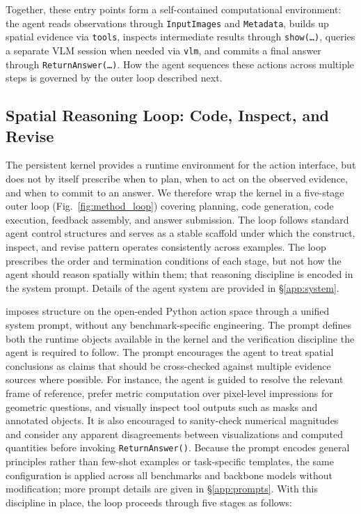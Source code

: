 Together, these entry points form a self-contained computational environment: the agent reads observations through \texttt{InputImages} and \texttt{Metadata}, builds up spatial evidence via \texttt{tools}, inspects intermediate results through \texttt{show(\ldots)}, queries a separate VLM session when needed via \texttt{vlm}, and commits a final answer through \texttt{ReturnAnswer(\ldots)}.
How the agent sequences these actions across multiple steps is governed by the outer loop described next.

\subsection{Spatial Reasoning Loop: Code, Inspect, and Revise}
\label{sec:loop}

The persistent kernel provides a runtime environment for the action interface, but does not by itself prescribe when to plan, when to act on the observed evidence, and when to commit to an answer.
We therefore wrap the kernel in a five-stage outer loop (Fig.~\ref{fig:method_loop}) covering planning, code generation, code execution, feedback assembly, and answer submission.
The loop follows standard agent control structures and serves as a stable scaffold under which the construct, inspect, and revise pattern operates consistently across examples.
The loop prescribes the order and termination conditions of each stage, but not how the agent should reason spatially within them; that reasoning discipline is encoded in the system prompt. Details of the agent system are provided in \S\ref{app:system}.

\ours{} imposes structure on the open-ended Python action space through a unified system prompt, without any benchmark-specific engineering.
The prompt defines both the runtime objects available in the kernel and the verification discipline the agent is required to follow.
The prompt encourages the agent to treat spatial conclusions as claims that should be cross-checked against multiple evidence sources where possible.
For instance, the agent is guided to resolve the relevant frame of reference, prefer metric computation over pixel-level impressions for geometric questions, and visually inspect tool outputs such as masks and annotated objects.
It is also encouraged to sanity-check numerical magnitudes and consider any apparent disagreements between visualizations and computed quantities before invoking \texttt{ReturnAnswer()}.
Because the prompt encodes general principles rather than few-shot examples or task-specific templates, the same configuration is applied across all benchmarks and backbone models without modification; more prompt details are given in \S\ref{app:prompts}.
With this discipline in place, the loop proceeds through five stages as follows:


